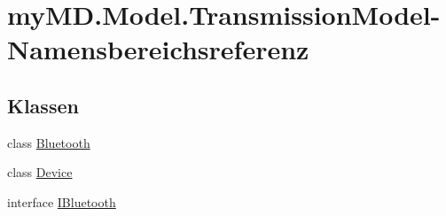\hypertarget{namespacemy_m_d_1_1_model_1_1_transmission_model}{}\section{my\+M\+D.\+Model.\+Transmission\+Model-\/\+Namensbereichsreferenz}
\label{namespacemy_m_d_1_1_model_1_1_transmission_model}
\subsection*{Klassen}
\begin{DoxyCompactItemize}
\item 
class \mbox{\hyperlink{classmy_m_d_1_1_model_1_1_transmission_model_1_1_bluetooth}{Bluetooth}}
\item 
class \mbox{\hyperlink{classmy_m_d_1_1_model_1_1_transmission_model_1_1_device}{Device}}
\item 
interface \mbox{\hyperlink{interfacemy_m_d_1_1_model_1_1_transmission_model_1_1_i_bluetooth}{I\+Bluetooth}}
\end{DoxyCompactItemize}
